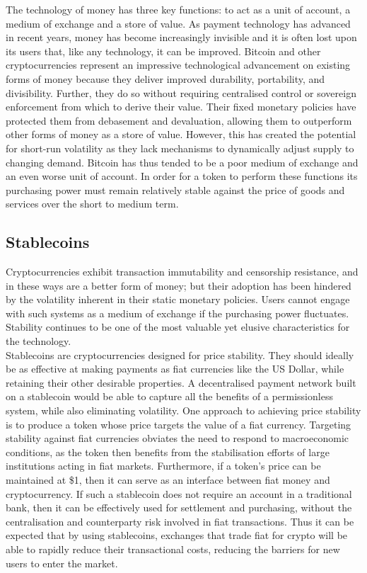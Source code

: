 \noindent The technology of money has three key functions: to act as a unit of account, a medium of exchange and a store of value. As payment technology has advanced in recent years, money has become increasingly invisible and it is often lost upon its users that, like any technology, it can be improved. Bitcoin and other cryptocurrencies represent an impressive technological advancement on existing forms of money because they deliver improved durability, portability, and divisibility. Further, they do so without requiring centralised control or sovereign enforcement from which to derive their value. Their fixed monetary policies have protected them from debasement and devaluation, allowing them to outperform other forms of money as a store of value. However, this has created the potential for short-run volatility as they lack mechanisms to dynamically adjust supply to changing demand. Bitcoin has thus tended to be a poor medium of exchange and an even worse unit of account. In order for a token to perform these functions its purchasing power must remain relatively stable against the price of goods and services over the short to medium term.

\subsection{Stablecoins}

\noindent Cryptocurrencies exhibit transaction immutability and censorship resistance, and in these ways are a better form of money; but their adoption has been hindered by the volatility inherent in their static monetary policies. Users cannot engage with such systems as a medium of exchange if the purchasing power fluctuates. Stability continues to be one of the most valuable yet elusive characteristics for the technology. \\

\noindent Stablecoins are cryptocurrencies designed for price stability. They should ideally be as effective at making payments as fiat currencies like the US Dollar, while retaining their other desirable properties. A decentralised payment network built on a stablecoin would be able to capture all the benefits of a permissionless system, while also eliminating volatility. One approach to achieving price stability is to produce a token whose price targets the value of a fiat currency. Targeting stability against fiat currencies obviates the need to respond to macroeconomic conditions, as the token then benefits from the stabilisation efforts of large institutions acting in fiat markets. Furthermore, if a token’s price can be maintained at \$1, then it can serve as an interface between fiat money and cryptocurrency. If such a stablecoin does not require an account in a traditional bank, then it can be effectively used for settlement and purchasing, without the centralisation and counterparty risk involved in fiat transactions. Thus it can be expected that by using stablecoins, exchanges that trade fiat for crypto will be able to rapidly reduce their transactional costs, reducing the barriers for new users to enter the market.

